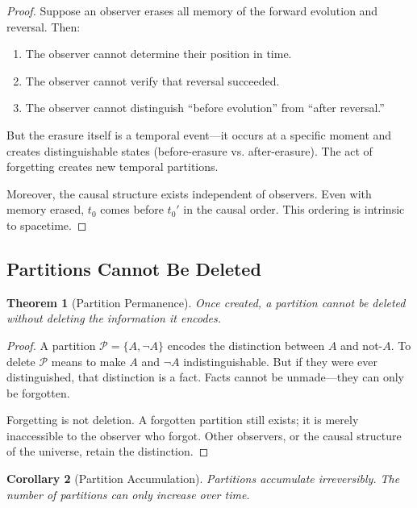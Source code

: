 \documentclass[twocolumn,10pt,a4paper]{article}
\newtheorem{theorem}{Theorem}[section]
\newtheorem{corollary}[theorem]{Corollary}
\theoremstyle{definition}
\theoremstyle{remark}
\begin{document}
\begin{proof}
Suppose an observer erases all memory of the forward evolution and reversal. Then:
\begin{enumerate}
    \item The observer cannot determine their position in time.
    \item The observer cannot verify that reversal succeeded.
    \item The observer cannot distinguish ``before evolution'' from ``after reversal.''
\end{enumerate}

But the erasure itself is a temporal event---it occurs at a specific moment and creates distinguishable states (before-erasure vs. after-erasure). The act of forgetting creates new temporal partitions.

Moreover, the causal structure exists independent of observers. Even with memory erased, $t_0$ comes before $t_0'$ in the causal order. This ordering is intrinsic to spacetime.
\end{proof}

\subsection{Partitions Cannot Be Deleted}

\begin{theorem}[Partition Permanence]
\label{thm:partition_permanence}
Once created, a partition cannot be deleted without deleting the information it encodes.
\end{theorem}

\begin{proof}
A partition $\mathcal{P} = \{A, \neg A\}$ encodes the distinction between $A$ and not-$A$. To delete $\mathcal{P}$ means to make $A$ and $\neg A$ indistinguishable. But if they were ever distinguished, that distinction is a fact. Facts cannot be unmade---they can only be forgotten.

Forgetting is not deletion. A forgotten partition still exists; it is merely inaccessible to the observer who forgot. Other observers, or the causal structure of the universe, retain the distinction.
\end{proof}

\begin{corollary}[Partition Accumulation]
Partitions accumulate irreversibly. The number of partitions can only increase over time.
\end{corollary}
\end{document}
